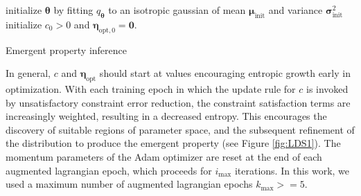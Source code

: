 \documentclass[11pt]{article}
\begin{document}
\begin{algorithm}\label{alg:epi}
\SetAlgoLined
 initialize $\bm{\theta}$ by fitting $q_{\bm{\theta}}$ to an isotropic gaussian of mean $\bm{\mu}_{\text{init}}$ and variance $\bm{\sigma}_{\text{init}}^2$ \\
 initialize $c_0 > 0$ and $\bm{\eta}_{\text{opt},0} = \mathbf{0}$. \\
 \caption{Emergent property inference}
\end{algorithm}

In general, $c$ and $\bm{\eta}_{\text{opt}}$ should start at values encouraging entropic growth early in optimization.  
With each training epoch in which the update rule for $c$ is invoked by unsatisfactory constraint error reduction, the constraint satisfaction terms are increasingly weighted, resulting in a decreased entropy.
This encourages the discovery of suitable regions of parameter space, and the subsequent refinement of the distribution to produce the emergent property (see Figure \ref{fig:LDS1}).
The momentum parameters of the Adam optimizer are reset at the end of each augmented lagrangian epoch, which proceeds for $i_{\text{max}}$ iterations.
In this work, we used a maximum number of augmented lagrangian epochs $k_{\text{max}} >= 5$.
\end{document}
